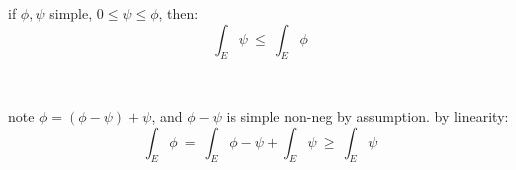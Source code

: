 \begin{crll}
	if $\phi,\psi$ simple, $0\leq\psi\leq\phi$, then:
	\begin{equation*}
		\int_{E}\psi \ \leq \ \int_{E}\phi
	\end{equation*}
\end{crll} \

\begin{pf}
	note $\phi=(\phi-\psi)+\psi$, and $\phi-\psi$ is simple non-neg by assumption.
	by linearity:
	\begin{equation*}
		\int_{E}\phi \ = \ \int_{E}\phi-\psi + \int_{E}\psi
		\ \geq \ \int_{E}\psi
	\end{equation*}
\end{pf}
